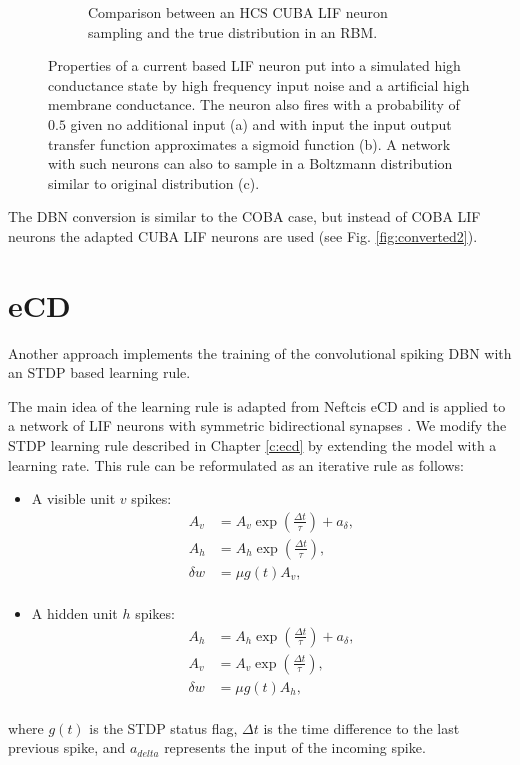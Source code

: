 \begin{figure}
\begin{subfigure}[t]{.5\textwidth}
  		\caption{Comparison between an HCS CUBA LIF neuron sampling and the true distribution in an RBM.}
  		\label{fig:sub2}
	\end{subfigure}
	\caption[Properties of a current based LIF neuron in a high conductance state.]{Properties of a current based LIF neuron put into a simulated high conductance state by high frequency input noise and a artificial high membrane conductance. The neuron also fires with a probability of $0.5$ given no additional input (a) and with input the input output transfer function approximates a sigmoid function (b). A network with such neurons can also to sample in a Boltzmann distribution similar to original distribution (c).}
	\label{fig:cubahcs}
\end{figure}
The DBN conversion is similar to the COBA case, but instead of COBA LIF neurons the adapted CUBA LIF neurons are used (see Fig. \ref{fig:converted2}).

\section{eCD} \label{c:ecdappr}

Another approach implements the training of the convolutional spiking DBN with an STDP based learning rule. 

The main idea of the learning rule is adapted from Neftcis eCD and is applied to a network of LIF neurons with symmetric bidirectional synapses \cite{Neftci2013}.
We modify the STDP learning rule described in Chapter \ref{c:ecd} by extending the model with a learning rate. 
This rule can be reformulated as an iterative rule as follows:
\begin{itemize}
\item A visible unit $v$ spikes: 
\[
\begin{split}
A_v &= A_v \exp(\frac{\Delta t}{\tau}) + a_{\delta} ,\\
A_h &= A_h \exp(\frac{\Delta t}{\tau}) ,\\
\delta w &= \mu g(t)  A_v  ,\\
\end{split}
\]
\item A hidden unit $h$ spikes: 
\[
\begin{split}
A_h &= A_h \exp(\frac{\Delta t}{\tau}) + a_{\delta} ,\\
A_v &= A_v \exp(\frac{\Delta t}{\tau}) ,\\
\delta w &= \mu  g(t) A_h  ,\\
\end{split}
\]
\end{itemize}
where $g(t)$ is the STDP status flag, $\Delta t$ is the time difference to the last previous spike, and $a_{delta}$ represents the input of the incoming spike.


